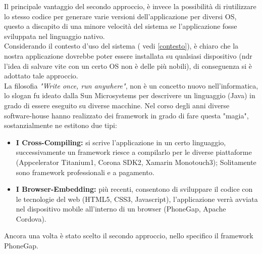 Il principale vantaggio del secondo approccio, è invece la possibilità di riutilizzare lo stesso codice per generare varie versioni dell'applicazione per diversi OS, questo a discapito di una minore velocità del sistema se l'applicazione fosse sviluppata nel linguaggio nativo. \\
Considerando il contesto d'uso del sistema ( vedi \ref{contesto}), è chiaro che la nostra applicazione dovrebbe poter essere installata su qualsiasi dispositivo (ndr l'idea di salvare vite con un certo OS non è delle più nobili), di conseguenza si è adottato tale approccio.\\
La filosofia \textit{"Write once, run anywhere"}, non è un concetto nuovo nell'informatica, lo slogan fu ideato dalla Sun Microsystems per descrivere un linguaggio (Java) in grado di essere eseguito su diverse macchine. Nel corso degli anni diverse software-house hanno realizzato dei framework in grado di fare questa "magia", sostanzialmente ne estitono due tipi:
\begin{itemize}
\item \textbf{ I Cross-Compiling:} si scrive l'applicazione in un certo linguaggio, successivamente un framework riesce a compilarlo per le diverse piattaforme (Appcelerator Titanium1, Corona SDK2, Xamarin Monotouch3); Solitamente sono framework professionali e a pagamento.
\item \textbf{I Browser-Embedding:} più recenti, consentono di sviluppare il codice con le tecnologie del web (HTML5, CSS3, Javascript), l'applicazione verrà avviata nel dispositivo mobile all'interno di un browser (PhoneGap, Apache Cordova).
\end{itemize} 
Ancora una volta è stato scelto il secondo approccio, nello specifico il framework PhoneGap.

